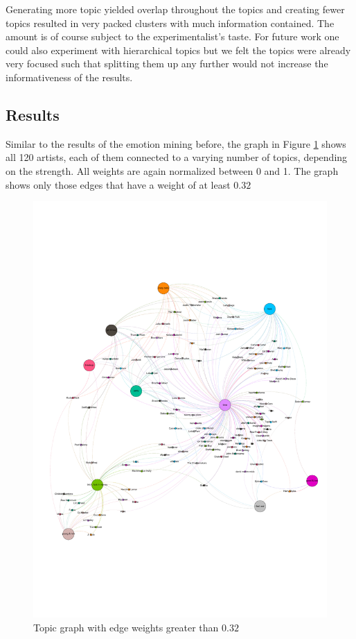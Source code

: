 \documentclass[10pt,a4paper]{article}
\begin{document}
	Generating more topic yielded overlap throughout the topics and creating fewer topics resulted in very packed clusters with much information contained. The amount is of course subject to the experimentalist's taste. For future work one could also experiment with hierarchical topics but we felt the topics were already very focused such that splitting them up any further would not increase the informativeness of the results.
	
		\subsection{Results}
		Similar to the results of the emotion mining before, the graph in Figure \ref{fig:topicgraph} shows all 120 artists, each of them connected to a varying number of topics, depending on the strength. All weights are again normalized between 0 and 1. The graph shows only those edges that have a weight of at least $0.32$
		
		\begin{figure}[htb]
			\centering
			\includegraphics[trim=0mm 50mm 0mm 50mm, clip, width=\linewidth]{data/topic_graph}
			\caption{Topic graph with edge weights greater than $0.32$}
			\label{fig:topicgraph}
		\end{figure}
		
\end{document}
